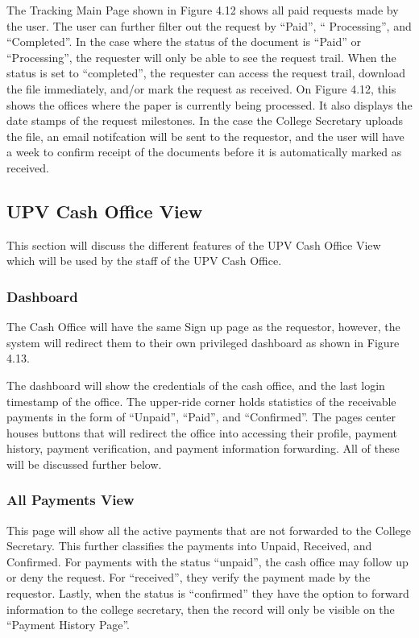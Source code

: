 The Tracking Main Page shown in Figure 4.12 shows all paid requests made by the user. The user can further filter out the request by “Paid”, “ Processing”, and “Completed”. In the case where the status of the document is “Paid” or “Processing”, the requester will only be able to see the request trail. When the status is set to “completed”, the requester can access the request trail, download the file immediately, and/or mark the request as received. On Figure 4.12, this shows the offices where the paper is currently being processed. It also displays the date stamps of the request milestones. In the case the College Secretary uploads the file, an email notifcation will be sent to the requestor, and the user will have a week to confirm receipt of the documents before it is automatically marked as received.

\subsection{UPV Cash Office View}

This section will discuss the different features of the UPV Cash Office View which will be used by the staff of the UPV Cash Office.

\subsubsection{Dashboard}

The Cash Office will have the same Sign up page as the requestor, however, the system will redirect them to their own privileged dashboard as shown in Figure 4.13.

The dashboard will show the credentials of the cash office, and the last login timestamp of the office. The upper-ride corner holds statistics of the receivable payments in the form of “Unpaid”, “Paid”, and “Confirmed”. The page\textsc{}s center houses buttons that will redirect the office into accessing their profile, payment history, payment verification, and payment information forwarding. All of these will be discussed further below.

\subsubsection{All Payments View}

This page will show all the active payments that are not forwarded to the College Secretary. This further classifies the payments into Unpaid, Received, and Confirmed. For payments with the status “unpaid”, the cash office may follow up or deny the request. For “received”, they verify the payment made by the requestor. Lastly, when the status is “confirmed”  they have the option to forward information to the college secretary, then the record will only be visible on the “Payment History Page”.

